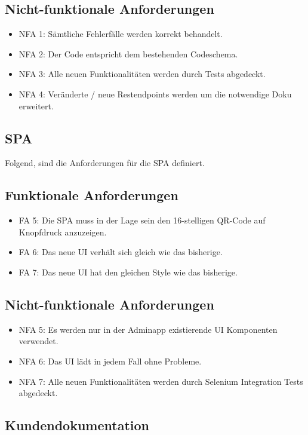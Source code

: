 \subsection*{Nicht-funktionale Anforderungen}
\begin{itemize}
	\item NFA 1: Sämtliche Fehlerfälle werden korrekt behandelt.
	\item NFA 2: Der Code entspricht dem bestehenden Codeschema.
	\item NFA 3: Alle neuen Funktionalitäten werden durch Tests abgedeckt.
	\item NFA 4: Veränderte / neue Restendpoints werden um die notwendige Doku erweitert.
\end{itemize}

\subsection{SPA} \label{subsec:anforderungenSPA}

Folgend, sind die Anforderungen für die SPA definiert.

\subsection*{Funktionale Anforderungen}
\begin{itemize}
	\item FA 5: Die SPA muss in der Lage sein den 16-stelligen QR-Code auf Knopfdruck anzuzeigen.
	\item FA 6: Das neue UI verhält sich gleich wie das bisherige.
	\item FA 7: Das neue UI hat den gleichen Style wie das bisherige.
\end{itemize}

\subsection*{Nicht-funktionale Anforderungen}
\begin{itemize}
	\item NFA 5: Es werden nur in der Adminapp existierende UI Komponenten verwendet.
	\item NFA 6: Das UI lädt in jedem Fall ohne Probleme.
	\item NFA 7: Alle neuen Funktionalitäten werden durch Selenium Integration Tests abgedeckt.
\end{itemize}

\subsection{Kundendokumentation}

